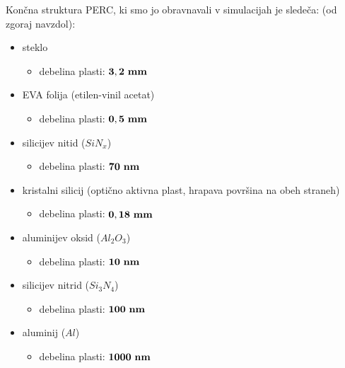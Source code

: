 \documentclass[a4paper,twoside,openright,12pt,slovene]{book}
\begin{document}
\clearpage

Končna struktura PERC, ki smo jo obravnavali v simulacijah je sledeča: (od zgoraj navzdol):

\begin{minipage}{.5\linewidth}
\vspace{-30pt}
\begin{itemize}
    \item steklo 
    \begin{itemize}
        \item debelina plasti: $\bf 3,2\ mm$
    \end{itemize}
    \item EVA folija (etilen-vinil acetat)
    \begin{itemize}
        \item debelina plasti: $\bf 0,5\ mm$
    \end{itemize}
    \item silicijev nitid ($SiN_x$) 
    \begin{itemize}
        \item debelina plasti: $\bf 70\ nm$
    \end{itemize}
    \item kristalni silicij (optično aktivna plast, hrapava površina na obeh straneh)
    \begin{itemize}
        \item debelina plasti: $\bf 0,18\ mm$
    \end{itemize}
    \item aluminijev oksid ($Al_2O_3$)
    \begin{itemize}
        \item debelina plasti: $\bf 10\ nm$
    \end{itemize}
    \item silicijev nitrid ($Si_3N_4$)
    \begin{itemize}
        \item debelina plasti: $\bf 100\ nm$
    \end{itemize}
    \item aluminij ($Al$)
    \begin{itemize}
        \item debelina plasti: $\bf 1000\ nm$
    \end{itemize}
\end{itemize}
\end{minipage}
\hfill
\end{document}
